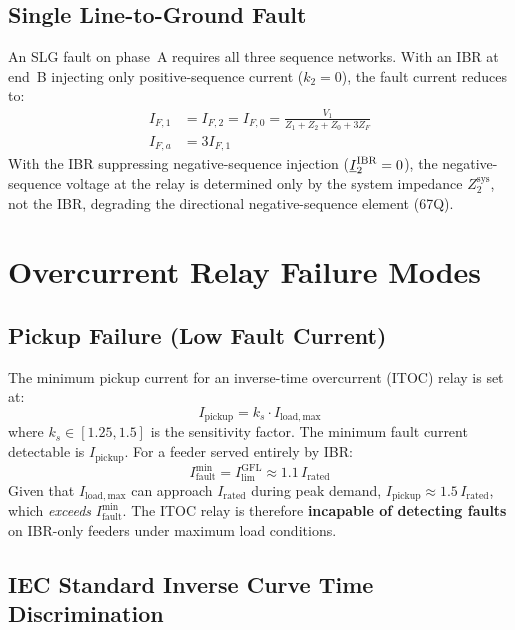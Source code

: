 \subsection{Single Line-to-Ground Fault}

An SLG fault on phase~A requires all three sequence networks. With an IBR
at end~B injecting only positive-sequence current ($k_2 = 0$),
the fault current reduces to:
\begin{align}
  I_{F,1} &= I_{F,2} = I_{F,0}
    = \frac{V_1}{Z_1 + Z_2 + Z_0 + 3Z_F}
  \label{eq:ch3_slg_seq} \\
  I_{F,a} &= 3I_{F,1}
  \label{eq:ch3_slg_ia}
\end{align}
With the IBR suppressing negative-sequence injection ($\underline{I}_2^\mathrm{IBR} = 0$),
the negative-sequence voltage at the relay is determined only by the
system impedance $Z_2^\mathrm{sys}$, not the IBR, degrading the
directional negative-sequence element (67Q).

\section{Overcurrent Relay Failure Modes}
\label{sec:ch3_oc}

\subsection{Pickup Failure (Low Fault Current)}

The minimum pickup current for an inverse-time overcurrent (ITOC) relay is
set at:
\begin{equation}
  I_\mathrm{pickup} = k_s \cdot I_\mathrm{load,max}
  \label{eq:ch3_pickup}
\end{equation}
where $k_s \in [1.25, 1.5]$ is the sensitivity factor. The minimum fault
current detectable is $I_\mathrm{pickup}$. For a feeder served entirely by
IBR:
\begin{equation}
  I_\mathrm{fault}^\mathrm{min} = I_\mathrm{lim}^\mathrm{GFL} \approx 1.1\,I_\mathrm{rated}
  \label{eq:ch3_ibr_min_fault}
\end{equation}
Given that $I_\mathrm{load,max}$ can approach $I_\mathrm{rated}$ during
peak demand, $I_\mathrm{pickup} \approx 1.5\,I_\mathrm{rated}$, which
\emph{exceeds} $I_\mathrm{fault}^\mathrm{min}$. The ITOC relay is therefore
\textbf{incapable of detecting faults} on IBR-only feeders under maximum
load conditions.

\subsection{IEC Standard Inverse Curve Time Discrimination}

